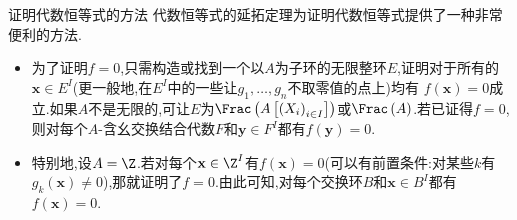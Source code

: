 \begin{remark}{证明代数恒等式的方法}{}
	代数恒等式的延拓定理为证明代数恒等式提供了一种非常便利的方法.
	\begin{itemize}
		\item 为了证明$f=0$,只需构造或找到一个以$A$为子环的无限整环$E$,证明对于所有的$\mathbf{x}\in E^{I}$(更一般地,在$E^I$中的一些让$g_{1},\ldots,g_{n}$不取零值的点上)均有 $f(\mathbf{x})=0$成立.如果$A$不是无限的,可让$E$为$\Frac\left(A\left[\left(X_{i}\right)_{i\in I}\right]\right)$或$\Frac\left(A\right)$.若已证得$f=0$,则对每个$A$-含幺交换结合代数$F$和$\mathbf{y}\in F^{I}$都有$f(\mathbf{y})=0$.
		\item 特别地,设$A=\Z$.若对每个$\mathbf{x}\in\Z^{I}$有$f(\mathbf{x})=0$(可以有前置条件:对某些$k$有$g_{k}(\mathbf{x})\neq 0$),那就证明了$f=0$.由此可知,对每个交换环$B$和$\mathbf{x}\in B^{I}$都有$f(\mathbf{x})=0$.
	\end{itemize}
\end{remark}

